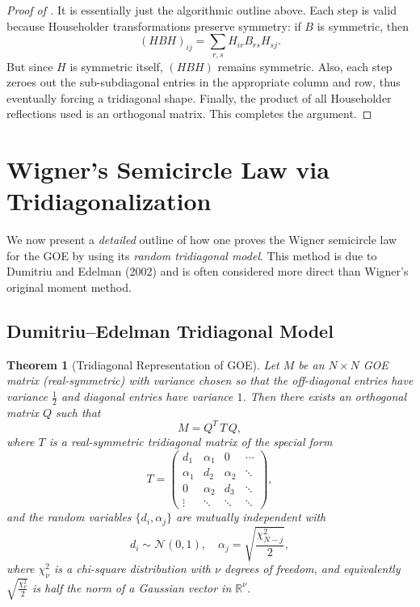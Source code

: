 \documentclass[letterpaper,11pt,oneside,reqno]{article}
\numberwithin{equation}{section}
\newtheorem{theorem}[proposition]{Theorem}
\theoremstyle{definition}
\begin{document}
\begin{proof}[Proof of ]
It is essentially just the algorithmic outline above.  Each step is valid because Householder transformations preserve symmetry: if \(B\) is symmetric, then
\[
  (H B H)_{ij}
  = \sum_{r,s} H_{ir} B_{rs} H_{sj}.
\]
But since \(H\) is symmetric itself, \((H B H)\) remains symmetric.  Also, each step zeroes out the sub-subdiagonal entries in the appropriate column and row, thus eventually forcing a tridiagonal shape.  Finally, the product of all Householder reflections used is an orthogonal matrix. This completes the argument.
\end{proof}

\section{Wigner’s Semicircle Law via Tridiagonalization}
\label{sec:Wigner-SC-detailed}

We now present a \emph{detailed} outline of how one proves the Wigner semicircle law for the GOE by using its \emph{random tridiagonal model}. This method is due to Dumitriu and Edelman (2002) and is often considered more direct than Wigner’s original moment method.

\subsection{Dumitriu–Edelman Tridiagonal Model}

\begin{theorem}[Tridiagonal Representation of GOE]
\label{thm:DE-model}
Let \(M\) be an \(N\times N\) GOE matrix (real-symmetric) with variance chosen so that the off-diagonal entries have variance \(\tfrac12\) and diagonal entries have variance \(1\).  Then there exists an orthogonal matrix \(Q\) such that
\[
   M = Q^T\,T\,Q,
\]
where \(T\) is a real-symmetric tridiagonal matrix of the special form
\[
   T = \begin{pmatrix}
         d_1 & \alpha_1 & 0 & \cdots \\
         \alpha_1 & d_2 & \alpha_2 & \ddots \\
         0 & \alpha_2 & d_3 & \ddots \\
         \vdots & \ddots & \ddots & \ddots
       \end{pmatrix},
\]
and the random variables \(\{d_i,\alpha_j\}\) are mutually independent with
\[
  d_i \sim \mathcal{N}(0,1),
  \quad
  \alpha_j = \sqrt{\frac{\chi^2_{N-j}}{2}},
\]
where \(\chi^2_{\nu}\) is a chi-square distribution with \(\nu\) degrees of freedom, and equivalently \(\sqrt{\tfrac{\chi^2_\nu}{2}}\) is half the norm of a Gaussian vector in \(\mathbb{R}^\nu\).
\end{theorem}
\end{document}
